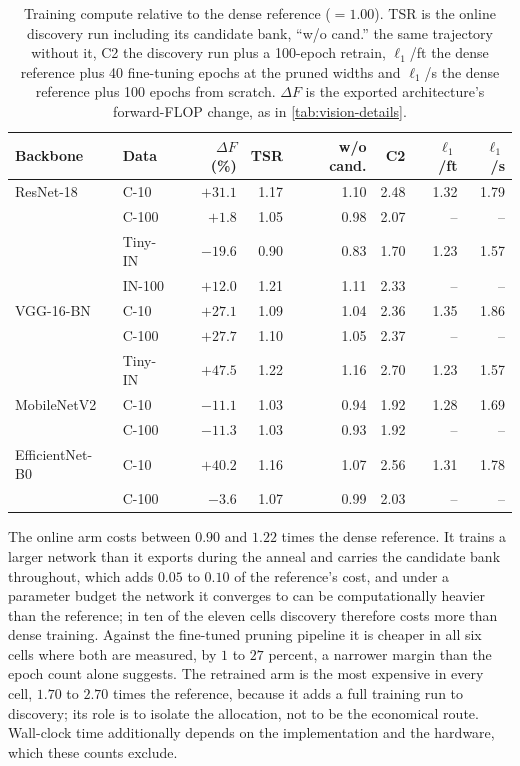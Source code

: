 \documentclass[10pt]{article}
\theoremstyle{paper}
\begin{document}
\begin{table}[h]
\centering
\caption{Training compute relative to the dense reference ($=1.00$). TSR is the online discovery
run including its candidate bank, ``w/o cand.'' the same trajectory without it, C2 the discovery
run plus a 100-epoch retrain, $\ell_1$/ft the dense reference plus 40 fine-tuning epochs at the
pruned widths and $\ell_1$/s the dense reference plus 100 epochs from scratch. $\Delta F$ is the
exported architecture's forward-FLOP change, as in \cref{tab:vision-details}.}
\label{tab:compute}
\footnotesize
\setlength{\tabcolsep}{4.0pt}
\begin{tabular}{@{}llrrrrrr@{}}
\toprule
Backbone & Data & $\Delta F$ (\%) & TSR & w/o cand. & C2 & $\ell_1$/ft & $\ell_1$/s \\
\midrule
ResNet-18 & C-10 & $+31.1$ & 1.17 & 1.10 & 2.48 & 1.32 & 1.79 \\
 & C-100 & $+1.8$ & 1.05 & 0.98 & 2.07 & -- & -- \\
 & Tiny-IN & $-19.6$ & 0.90 & 0.83 & 1.70 & 1.23 & 1.57 \\
 & IN-100 & $+12.0$ & 1.21 & 1.11 & 2.33 & -- & -- \\
\midrule
VGG-16-BN & C-10 & $+27.1$ & 1.09 & 1.04 & 2.36 & 1.35 & 1.86 \\
 & C-100 & $+27.7$ & 1.10 & 1.05 & 2.37 & -- & -- \\
 & Tiny-IN & $+47.5$ & 1.22 & 1.16 & 2.70 & 1.23 & 1.57 \\
\midrule
MobileNetV2 & C-10 & $-11.1$ & 1.03 & 0.94 & 1.92 & 1.28 & 1.69 \\
 & C-100 & $-11.3$ & 1.03 & 0.93 & 1.92 & -- & -- \\
\midrule
EfficientNet-B0 & C-10 & $+40.2$ & 1.16 & 1.07 & 2.56 & 1.31 & 1.78 \\
 & C-100 & $-3.6$ & 1.07 & 0.99 & 2.03 & -- & -- \\
\bottomrule
\end{tabular}
\end{table}

The online arm costs between $0.90$ and $1.22$ times the dense reference. It trains a larger
network than it exports during the anneal and carries the candidate bank throughout, which adds
$0.05$ to $0.10$ of the reference's cost, and under a parameter budget the network it converges to
can be computationally heavier than the reference; in ten of the eleven cells discovery therefore
costs more than dense training. Against the fine-tuned pruning pipeline it is cheaper in all six
cells where both are measured, by $1$ to $27$ percent, a narrower margin than the epoch count alone
suggests. The retrained arm is the most expensive in every cell, $1.70$ to $2.70$ times the
reference, because it adds a full training run to discovery; its role is to isolate the allocation,
not to be the economical route. Wall-clock time additionally depends on the implementation and the
hardware, which these counts exclude.
\end{document}
